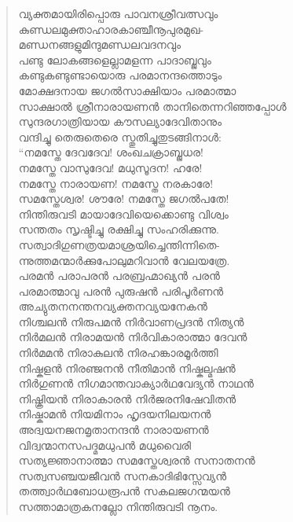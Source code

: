 \begin{verse}
വ്യക്തമായിരിപ്പൊരു പാവനശ്രീവത്സവും\\
കുണ്ഡലമുക്താഹാരകാഞ്ചീനൂപുരമുഖ-\\
മണ്ഡനങ്ങളുമിന്ദുമണ്ഡലവദനവും\\
പണ്ടു ലോകങ്ങളെല്ലാമളന്ന പാദാബ്ജവും\\
കണ്ടുകണ്ടുണ്ടായൊരു പരമാനന്ദത്തൊടും\\
മോക്ഷദനായ ജഗല്‍സാക്ഷിയാം പരമാത്മാ\\
സാക്ഷാല്‍ ശ്രീനാരായണന്‍ \hbox{താനിതെന്നറിഞ്ഞപ്പോള്‍}\\
സുന്ദരഗാത്രിയായ കൗസല്യാദേവിതാനും\\
വന്ദിച്ചു തെരുതെരെ സ്തുതിച്ചുതുടങ്ങിനാള്‍:\\
“നമസ്തേ ദേവദേവ! ശംഖചക്രാബ്ജധര!\\
നമസ്തേ വാസുദേവ! മധുസൂദന! ഹരേ!\\
നമസ്തേ നാരായണ! നമസ്തേ നരകാരേ!\\
സമസ്തേശ്വര! ശൗരേ! നമസ്തേ ജഗല്‍പതേ!\\
നിന്തിരുവടി മായാദേവിയെക്കൊണ്ടു വിശ്വം\\
സന്തതം സൃഷ്ടിച്ചു രക്ഷിച്ചു സംഹരിക്കുന്നു.\\
സത്വാദിഗുണത്രയമാശ്രയിച്ചെന്തിന്നിതെ-\\
ന്നുത്തമന്മാര്‍ക്കുപോലുമറിവാന്‍ വേലയത്രേ.\\
പരമന്‍ പരാപരന്‍ പരബ്രഹ്മാഖ്യന്‍ പരന്‍\\
പരമാത്മാവു പരന്‍ പുരുഷന്‍ പരിപൂര്‍ണന്‍\\
അച്യുതനനന്തനവ്യക്തനവ്യയനേകന്‍\\
നിശ്ചലന്‍ നിരുപമന്‍ നിര്‍വാണപ്രദന്‍ നിത്യന്‍\\
നിര്‍മലന്‍ നിരാമയന്‍ നിര്‍വികാരാത്മാ ദേവന്‍\\
നിര്‍മമന്‍ നിരാകുലന്‍ നിരഹങ്കാരമൂര്‍ത്തി\\
നിഷ്കളന്‍ നിരഞ്ജനന്‍ നീതിമാന്‍ നിഷ്കല്മഷന്‍\\
നിര്‍ഗുണന്‍ നിഗമാന്തവാക്യാര്‍ഥവേദ്യന്‍ നാഥന്‍\\
നിഷ്ക്രിയന്‍ നിരാകാരന്‍ നിര്‍ജരനിഷേവിതന്‍\\
നിഷ്കാമന്‍ നിയമിനാം ഹൃദയനിലയനന്‍\\
അദ്വയനജനമൃതാനന്ദന്‍ നാരായണന്‍\\
വിദ്വന്മാനസപദ്മമധുപന്‍ മധുവൈരി\\
സത്യജ്ഞാനാത്മാ സമസ്തേശ്വരന്‍ സനാതനന്‍\\
സത്വസഞ്ചയജീവന്‍ സനകാദിഭിസ്സേവ്യന്‍\\
തത്ത്വാര്‍ഥബോധരൂപന്‍ സകലജഗന്മയന്‍\\
സത്താമാത്രകനല്ലോ നിന്തിരുവടി നൂനം.\\

\end{verse}
